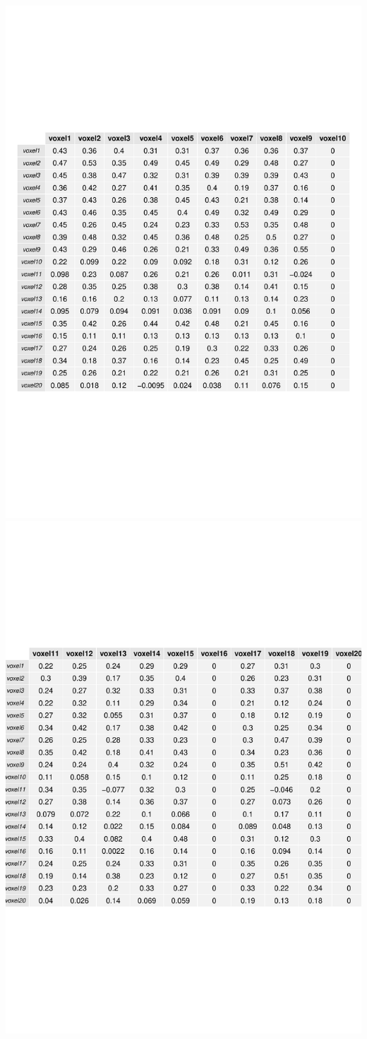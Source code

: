 \documentclass[english]{amsart}
\begin{document}
\includegraphics[width=\linewidth]{Corr_table2.pdf}
\newpage
\includegraphics[width=\linewidth]{Corr_table1.pdf}
\end{document}
